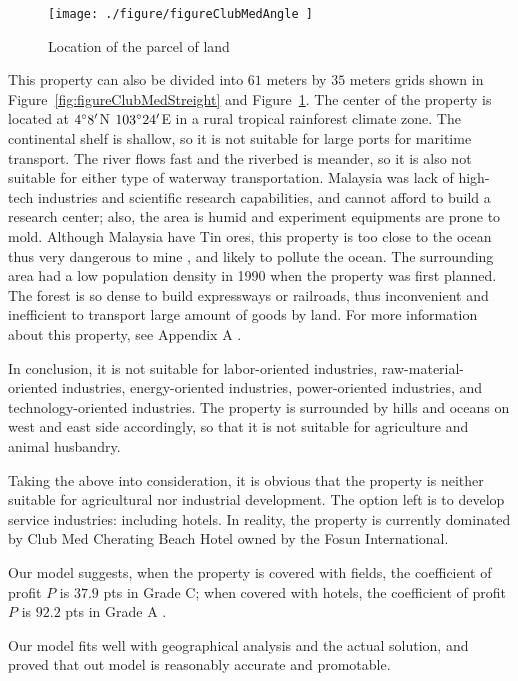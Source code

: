 \documentclass[./main.tex]{subfiles}
\begin{document}
    \begin{figure}[H]
        \centering
        \texttt{[image: ./figure/figureClubMedAngle ]}
        \caption{Location of the parcel of land}
        \label{fig:figureClubMedAngle}
    \end{figure}

    This property can also be divided into $61$ meters by $35$ meters grids shown in
    Figure~\ref{fig:figureClubMedStreight} and Figure~\ref{fig:figureClubMedAngle}.
    The center of the property is located at $4\degree 8\rq$N $103\degree 24\rq$E in a rural tropical rainforest
    climate zone.
    The continental shelf is shallow, so it is not suitable for large ports for maritime transport.
    The river flows fast and the riverbed is meander, so it is also not suitable for either type of waterway
    transportation.
    Malaysia was lack of high-tech industries and scientific research capabilities, and cannot afford to build a
    research center; also, the area is humid and experiment equipments are prone to mold.
    Although Malaysia have Tin ores, this property is too close to the ocean thus very dangerous to mine
    , and
    likely to pollute the ocean.
    The surrounding area had a low population density in 1990 when the property was first planned.
    The forest is so dense to build expressways or railroads, thus inconvenient and inefficient to transport
    large amount of goods by land.
    For more information about this property, see Appendix A .

    In conclusion, it is not suitable for labor-oriented industries, raw-material-oriented
    industries, energy-oriented industries, power-oriented industries, and technology-oriented industries.
    The property is surrounded by hills and oceans on west and east side accordingly, so that it is
    not suitable for agriculture and animal husbandry.

    Taking the above into consideration, it is obvious that the property is neither suitable for agricultural nor
    industrial development.
    The option left is to develop service industries: including hotels.
    In reality, the property is currently dominated by Club Med Cherating Beach Hotel owned by the Fosun International.

    Our model suggests, when the property is covered with fields, the coefficient of profit $P$ is $37.9$ pts in
    Grade C;
    when covered with hotels, the coefficient of profit $P$ is $92.2$ pts in Grade A .

    Our model fits well with geographical analysis and the actual solution, and proved that out model is reasonably
    accurate and promotable.
\end{document}
